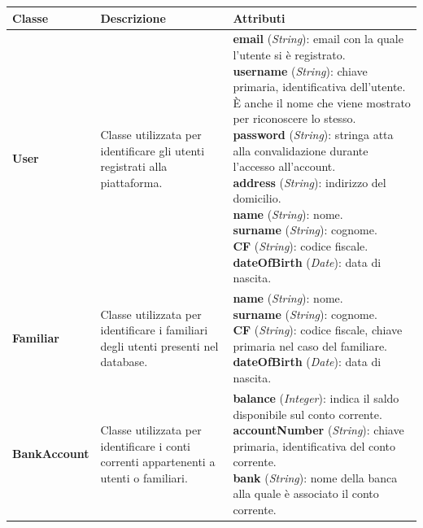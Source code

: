 \begin{longtable}{m{2.7cm}|m{4cm}|m{7cm}}

    \rowcolor{black!10}
    \textbf{Classe} & \textbf{Descrizione} & \textbf{Attributi} \\ \hline
    \endhead

    \textbf{User} & \raggedright Classe utilizzata per identificare gli utenti registrati alla piattaforma. &
    \parbox{7cm}{
        \textbf{email} (\textit{String}): email con la quale l'utente si è registrato. \\ 
        \textbf{username} (\textit{String}): chiave primaria, identificativa dell'utente. È anche il nome che viene mostrato per riconoscere lo stesso. \\
        \textbf{password} (\textit{String}): stringa atta alla convalidazione durante l'accesso all'account. \\
        \textbf{address} (\textit{String}): indirizzo del domicilio. \\
        \textbf{name} (\textit{String}): nome. \\
        \textbf{surname} (\textit{String}): cognome. \\
        \textbf{CF} (\textit{String}): codice fiscale. \\
        \textbf{dateOfBirth} (\textit{Date}): data di nascita.
    } \\ \hline

    \textbf{Familiar} & \raggedright Classe utilizzata per identificare i familiari degli utenti presenti nel database. &
    \parbox{7cm}{
        \textbf{name} (\textit{String}): nome. \\
        \textbf{surname} (\textit{String}): cognome. \\
        \textbf{CF} (\textit{String}): codice fiscale, chiave primaria nel caso del familiare. \\
        \textbf{dateOfBirth} (\textit{Date}): data di nascita.
    } \\ \hline

    \textbf{BankAccount} & \raggedright Classe utilizzata per identificare i conti correnti appartenenti a utenti o familiari. &
    \parbox{7cm}{
        \textbf{balance} (\textit{Integer}): indica il saldo disponibile sul conto corrente. \\
        \textbf{accountNumber} (\textit{String}): chiave primaria, identificativa del conto corrente. \\
        \textbf{bank} (\textit{String}): nome della banca alla quale è associato il conto corrente.
    } \\ \hline


\end{longtable}
